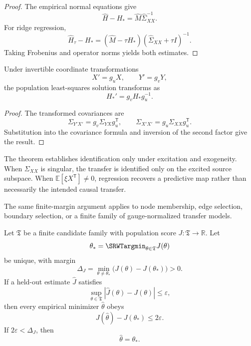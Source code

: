 \begin{proof}
The empirical normal equations give
\[
\widehat H-H_*
=
\widehat M\widehat\Sigma_{XX}^{-1}.
\]
For ridge regression,
\[
\widehat H_\tau-H_*
=
(\widehat M-\tau H_*)
(\widehat\Sigma_{XX}+\tau I)^{-1}.
\]
Taking Frobenius and operator norms yields both estimates.
\end{proof}

\begin{SRWTproposition}
\label{SRWT:prop:ols-gauge-covariance}
Under invertible coordinate transformations
\[
X'=g_uX,
\qquad
Y'=g_vY,
\]
the population least-squares solution transforms as
\[
H_*'=g_vH_*g_u^{-1}.
\]
\end{SRWTproposition}

\begin{proof}
The transformed covariances are
\[
\Sigma_{Y'X'}=g_v\Sigma_{YX}g_u^{\mathsf T},
\qquad
\Sigma_{X'X'}=g_u\Sigma_{XX}g_u^{\mathsf T}.
\]
Substitution into the covariance formula and inversion of the second factor
give the result.
\end{proof}

The theorem establishes identification only under excitation and exogeneity.
When \(\Sigma_{XX}\) is singular, the transfer is identified only on the
excited source subspace. When \(\mathbb E[\xi X^{\mathsf T}]\neq0\), regression
recovers a predictive map rather than necessarily the intended causal
transfer.


The same finite-margin argument applies to node membership, edge selection,
boundary selection, or a finite family of gauge-normalized transfer models.

\begin{SRWTtheorem}
\label{SRWT:thm:uniform-structure-selection}
Let \(\mathfrak T\) be a finite candidate family with population score
\(J:\mathfrak T\to\mathbb R\). Let
\[
\theta_*
=
\SRWTargmin_{\theta\in\mathfrak T}J(\theta)
\]
be unique, with margin
\[
\Delta_J
=
\min_{\theta\neq\theta_*}
\bigl(J(\theta)-J(\theta_*)\bigr)>0.
\]
If a held-out estimate \(\widehat J\) satisfies
\[
\sup_{\theta\in\mathfrak T}
|\widehat J(\theta)-J(\theta)|
\leq\varepsilon,
\]
then every empirical minimizer \(\widehat\theta\) obeys
\[
\boxed{
J(\widehat\theta)-J(\theta_*)
\leq2\varepsilon.
}
\]
If \(2\varepsilon<\Delta_J\), then
\[
\boxed{\widehat\theta=\theta_*.}
\]
\end{SRWTtheorem}

